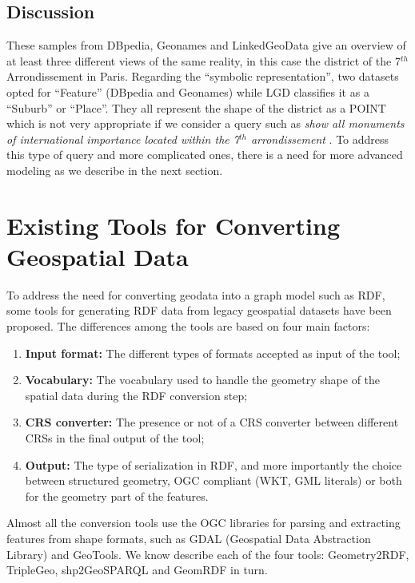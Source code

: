 \subsection{Discussion}
These samples from DBpedia, Geonames and LinkedGeoData give an overview of at least three different views of the same reality, in this case the district of the 7$^{th}$ Arrondissement in Paris. Regarding the ``symbolic representation'', two datasets opted for ``Feature'' (DBpedia and Geonames) while LGD classifies it as a ``Suburb'' or ``Place''. They all represent the shape of the district as a POINT which is not very appropriate if we consider a query such as \emph{show all monuments of international importance located within the 7$^{th}$ arrondissement }. To address this type of query and more complicated ones, there is a need for more advanced modeling as we describe in the next section.

\section{Existing Tools for Converting Geospatial Data}
\label{sec:toolgeo}
To address the need for converting geodata into a graph model such as RDF, some tools  for generating RDF data from legacy geospatial datasets have been proposed. The differences among the tools are based on four main factors:
\begin{enumerate}
\item \textbf{Input format:} The different types of formats accepted as input of the tool;
\item \textbf{Vocabulary:} The vocabulary used to handle the geometry shape of the spatial data during the RDF conversion step;
\item \textbf{CRS converter:} The presence or not of a CRS converter between different CRSs in the final output of the tool;
\item \textbf{Output:} The type of serialization in RDF, and more importantly the choice between structured geometry, OGC compliant (WKT, GML literals) or both for the geometry part of the features.
\end{enumerate}

Almost all the conversion tools use the OGC libraries for parsing and extracting features from shape formats, such as GDAL (Geospatial Data Abstraction Library) and GeoTools. We know describe each of the four tools: Geometry2RDF, TripleGeo, shp2GeoSPARQL and GeomRDF in turn.

